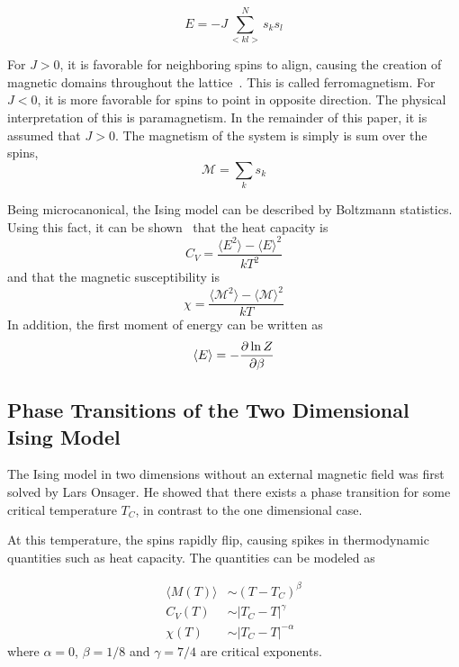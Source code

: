 \documentclass[aps,reprint]{revtex4-1}
\newcommand{\mean}[1]{\langle #1 \rangle}
\begin{document}
\begin{equation}
  \label{eq:3}
  E = -J\sum_{<kl>}^{N}s_{k}s_{l}
\end{equation}

For \(J>0\), it is favorable for neighboring spins to align, causing the
creation of magnetic domains throughout the lattice~\cite{physicslectures}.
This is called ferromagnetism. For \(J<0\), it is more favorable for spins to
point in opposite direction. The physical interpretation of this is
paramagnetism. In the remainder of this paper, it is assumed that \(J>0\).
The magnetism of the system is simply is sum over the spins,
\begin{equation}
  \label{eq:1}
  \mathcal{M} = \sum_{k} s_{k}
\end{equation}

Being microcanonical, the Ising model can be described by Boltzmann statistics.
Using this fact, it can be shown~\cite{physicslectures} that the heat capacity is
\begin{equation}
  \label{eq:4}
  C_V = \frac{\mean{E^2} - \mean{E}^2}{kT^2}
\end{equation}
and that the magnetic susceptibility is
\begin{equation}
  \label{eq:5}
  \chi = \frac{\mean{\mathcal{M}^2} - \mean{\mathcal{M}}^2}{kT}
\end{equation}
In addition, the first moment of energy can be written as
\begin{equation}
  \label{eq:6}
  \mean{E} = - \pdv{\ln{Z}}{\beta}
\end{equation}

\subsection{Phase Transitions of the Two Dimensional Ising Model}
\label{sec:phase-trans-two}
The Ising model in two dimensions without an external magnetic field was first
solved by Lars Onsager. He showed that there exists a phase transition for some
critical temperature \(T_{C}\), in contrast to the one dimensional case.

At this
temperature, the spins rapidly flip, causing spikes in thermodynamic quantities such as
heat capacity. The quantities can be modeled as~\cite{project3}


\begin{align*}
  \mean{M(T)} &\sim (T - T_C)^\beta \\
  C_V(T) &\sim |T_C - T|^\gamma \\
  \chi (T) &\sim |T_C - T|^{-\alpha}
\end{align*}
where $\alpha = 0$, $\beta = 1/8$ and $\gamma = 7/4$ are critical exponents.
\end{document}
